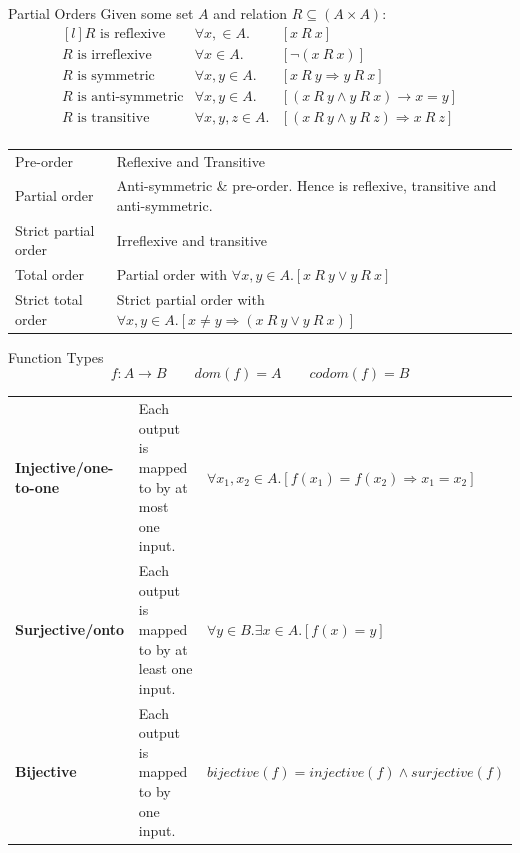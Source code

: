 \begin{definitionbox}{Partial Orders}
    Given some set $A$ and relation $R \subseteq (A \times A)$:
    \[\begin{matrix*}[l]
        R \text{ is reflexive} & \forall x, \in A . & [x \ R \ x] \\
        R \text{ is irreflexive} & \forall x \in A . & [\neg (x \ R \ x)] \\
        R \text{ is symmetric} & \forall x, y \in A . & [x \ R \ y \Rightarrow y \ R \ x] \\
        R \text{ is anti-symmetric} & \forall x, y \in A . & [(x \ R \ y \land y \ R \ x) \rightarrow x = y] \\
        R \text{ is transitive} & \forall x, y, z \in A . & [(x \ R \ y \land y \ R \ z) \Rightarrow x \ R \ z] \\
    \end{matrix*}\]
    \begin{center}
        \begin{tabular}{l l}
            Pre-order & Reflexive and Transitive \\
            Partial order & Anti-symmetric \& pre-order. Hence is reflexive, transitive and anti-symmetric. \\
            Strict partial order & Irreflexive and transitive \\
            Total order & Partial order with $\forall x, y \in A. [x \ R \ y \lor y \ R \ x]$ \\
            Strict total order & Strict partial order with $\forall x, y \in A. [x \neq y \Rightarrow (x \ R \ y \lor y \ R \ x)]$ \\
        \end{tabular}
    \end{center}

\end{definitionbox}
\begin{definitionbox}{Function Types}
    \[f: A \to B \qquad dom(f) = A \qquad codom(f) = B\]
    \begin{tabular}{l p{} l}
        \textbf{Injective/one-to-one} & Each output is mapped to by at most one input. & $\forall x_1, x_2 \in A. [f(x_1) = f(x_2) \Rightarrow x_1 = x_2]$ \\
        \textbf{Surjective/onto} & Each output is mapped to by at least one input. & $\forall y \in B. \exists x \in A. [f(x) = y]$ \\
        \textbf{Bijective} & Each output is mapped to by one input. & $bijective(f) = injective(f) \land surjective(f)$ \\
    \end{tabular}
\end{definitionbox}
